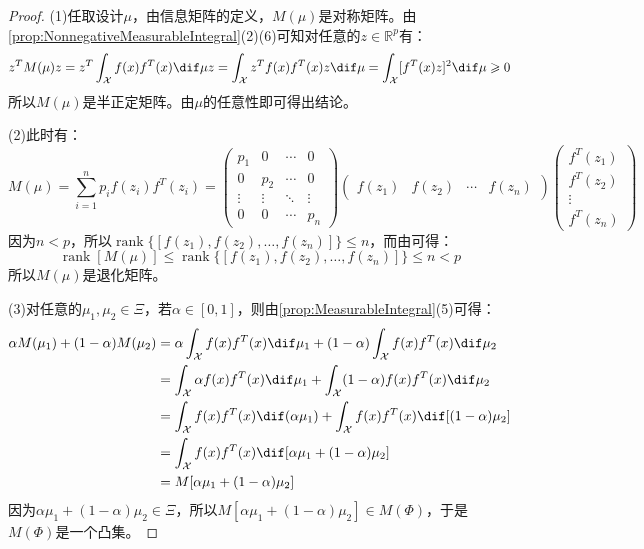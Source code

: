 \begin{proof}
	(1)任取设计$\mu$，由信息矩阵的定义，$M(\mu)$是对称矩阵。由\cref{prop:NonnegativeMeasurableIntegral}(2)(6)可知对任意的$z\in\mathbb{R}^{p}$有：
	\begin{equation*}
		z^TM(\mu)z=z^T\int_{\mathcal{X}}f(x)f^T(x)\dif\mu z=\int_{\mathcal{X}}z^Tf(x)f^T(x)z\dif\mu=\int_{\mathcal{X}}[f^T(x)z]^2\dif\mu\geqslant0
	\end{equation*}
	所以$M(\mu)$是半正定矩阵。由$\mu$的任意性即可得出结论。\par
	(2)此时有：
	\begin{equation*}
		M(\mu)=\sum_{i=1}^{n}p_if(z_i)f^T(z_i)=
		\begin{pmatrix}
			p_1 & 0 & \cdots & 0 \\
			0 & p_2 & \cdots & 0 \\
			\vdots & \vdots & \ddots & \vdots \\
			0 & 0 & \cdots & p_n 
		\end{pmatrix}
		\begin{pmatrix}
			f(z_1) & f(z_2) & \cdots & f(z_n)
		\end{pmatrix}
		\begin{pmatrix}
			f^T(z_1) \\
			f^T(z_2) \\
			\vdots \\
			f^T(z_n)
		\end{pmatrix}
	\end{equation*}
	因为$n<p$，所以$\operatorname{rank}\{[f(z_1),f(z_2),\dots,f(z_n)]\}\leqslant n$，而由可得：
	\begin{equation*}
		\operatorname{rank}[M(\mu)]\leqslant\operatorname{rank}\{[f(z_1),f(z_2),\dots,f(z_n)]\}\leqslant n<p
	\end{equation*}
	所以$M(\mu)$是退化矩阵。\par
	(3)对任意的$\mu_1,\mu_2\in\Xi$，若$\alpha\in[0,1]$，则由\cref{prop:MeasurableIntegral}(5)可得：
	\begin{align*}
		\alpha M(\mu_1)+(1-\alpha)M(\mu_2)&=\alpha\int_{\mathcal{X}}f(x)f^T(x)\dif\mu_1+(1-\alpha)\int_{\mathcal{X}}f(x)f^T(x)\dif\mu_2 \\
		&=\int_{\mathcal{X}}\alpha f(x)f^T(x)\dif\mu_1+\int_{\mathcal{X}}(1-\alpha)f(x)f^T(x)\dif\mu_2 \\
		&=\int_{\mathcal{X}}f(x)f^T(x)\dif(\alpha\mu_1)+\int_{\mathcal{X}}f(x)f^T(x)\dif[(1-\alpha)\mu_2] \\
		&=\int_{\mathcal{X}}f(x)f^T(x)\dif[\alpha\mu_1+(1-\alpha)\mu_2] \\
		&=M[\alpha\mu_1+(1-\alpha)\mu_2]
	\end{align*}
	因为$\alpha\mu_1+(1-\alpha)\mu_2\in\Xi$，所以$M[\alpha\mu_1+(1-\alpha)\mu_2]\in M(\Phi)$，于是$M(\Phi)$是一个凸集。\par
\end{proof}
